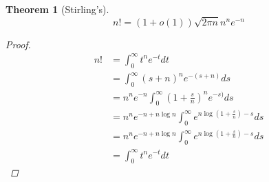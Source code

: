 \documentclass{article}
\newcommand{\parens}[1]{\left( #1 \right)}
\newtheorem{theorem}{Theorem}
\begin{document}
\begin{theorem}[Stirling's]
    \begin{equation}
        n! = (1 + o(1)) \sqrt{2 \pi n} n^n e^{-n}
    \end{equation}
    \begin{proof}
    \begin{align}
        n! &= \int_0^\infty t^n e^{-t} dt \\
        &= \int_0^\infty (s+n)^{n} e^{-(s+n)} ds \\
        &= n^n e^{-n} \int_0^\infty \parens{ 1 + \frac{s}{n}}^{n} e^{-s)} ds \\
        &= n^n e^{-n + n \log n} \int_0^\infty e^{n \log \parens{1 + \frac{s}{n}} - s} ds \\
        &= n^n e^{-n + n \log n} \int_0^\infty e^{n \log \parens{1 + \frac{s}{n}} - s} ds \\
        &= \int_0^\infty t^n e^{-t} dt 
    \end{align}
\end{proof}
\end{theorem}
\end{document}
